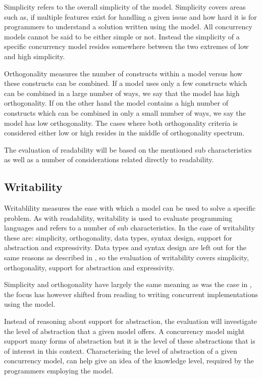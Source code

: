 Simplicity refers to the overall simplicity of the model\cite[p. 8]{sebestaProLang}. Simplicity covers areas such as, if multiple features exist for handling a given issue and how hard it is for programmers to understand a solution written using the model. All concurrency models cannot be said to be either simple or not. Instead the simplicity of a specific concurrency model resides somewhere between the two extremes of low and high simplicity.  

Orthogonality measures the number of constructs within a model versus how these constructs can be combined\cite[p. 9]{sebestaProLang}. If a model uses only a few constructs which can be combined in a large number of ways, we say that the model has high orthogonality. If on the other hand the model contains a high number of constructs which can be combined in only a small number of ways, we say the model has low orthogonality. The cases where both orthogonality criteria is considered either low or high resides in the middle of orthogonality spectrum.

The evaluation of readability will be based on the mentioned sub characteristics as well as a number of considerations related directly to readability.

\subsection{Writability}\label{sec:writablity}
Writablility measures the ease with which a model can be used to solve a specific problem\cite[p. 13]{sebestaProLang}. As with readability, writability is used to evaluate programming languages and refers to a number of sub characteristics. In the case of writability these are\cite[p. 8]{sebestaProLang}: simplicity, orthogonality, data types, syntax design, support for abstraction and expressivity. Data types and syntax design are left out for the same reasons as described in , so the evaluation of writability covers simplicity, orthogonality, support for abstraction and expressivity. 

Simplicity and orthogonality have largely the same meaning as was the case in , the focus has however shifted from reading to writing concurrent implementations using the model. 

Instead of reasoning about support for abstraction, the evaluation will investigate the level of abstraction that a given model offers. A concurrency model might support many forms of abstraction but it is the level of these abstractions that is of interest in this context. Characterising the level of abstraction of a given concurrency model, can help give an idea of the knowledge level, required by the programmers employing the model.

